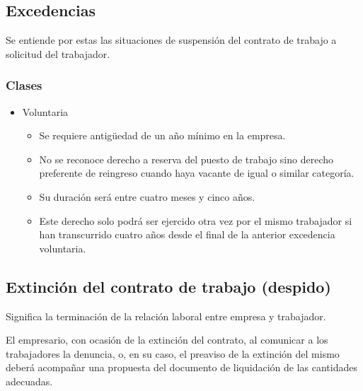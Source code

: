 \documentclass{article}
\begin{document}
	\subsection*{Excedencias}
	
	Se entiende por estas las situaciones de suspensión del contrato de trabajo a solicitud del trabajador.
	
	\subsubsection*{Clases}
	
	\begin{itemize}
		\item Voluntaria
		\begin{itemize}
			\item Se requiere antigüedad de un año mínimo en la empresa.
			\item No se reconoce derecho a reserva del puesto de trabajo sino derecho preferente de reingreso cuando haya vacante de igual o similar categoría.
			\item Su duración será entre cuatro meses y cinco años.
			\item Este derecho solo podrá ser ejercido otra vez por el mismo trabajador si han transcurrido cuatro años desde el final de la anterior excedencia voluntaria.
		\end{itemize}
	\end{itemize}
	
	\subsection*{Extinción del contrato de trabajo (despido)}
	
	Significa la terminación de la relación laboral entre empresa y trabajador.
	
	El empresario, con ocasión de la extinción del contrato, al comunicar a los trabajadores la denuncia, o, en su caso, el preaviso de la extinción del mismo deberá acompañar una propuesta del documento de liquidación de las cantidades adecuadas.
	
\end{document}
